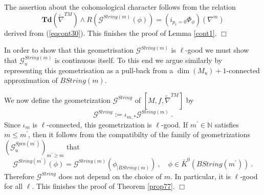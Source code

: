 \documentclass[12pt]{article}
\newcommand{\cG}{{\mathcal{G}}}
\def\hB{\hspace*{\fill}$\Box$ \newline\noindent}
\newcommand{\nat}{{\mathbb{N}}}
\newcommand{\Q}{{\mathbb{Q}}}
\newcommand{\Td}{{\mathbf{Td}}}
\begin{document}
The assertion about the cohomological character follows from  the relation
$$\Td(\tilde \nabla^{TM})\wedge R(\cG^{String(m)}(\phi))=(i_{p_{1}=0} \Phi_{ \phi })(\nabla^{m})$$
derived from (\ref{eqcont30}). This finishes the proof of Lemma \ref{cont1}. \hB

In order to show that this geometrisation $\cG^{String(m)}$   is  $\ell$-good we must show that
$ \cG_{u}^{String(m)}$ is continuous itself. To this end we argue similarly by representing this geometrisation
as a pull-back from a $\dim(M_{u})+1$-connected approximation of $BString(m)$. 

We now define   the geometrization $\cG^{String}$ of $[M,f,\tilde \nabla^{TM}]$ by
$$\cG^{String}:=\iota_{m,*} \cG^{String(m)}\ .$$  Since $\iota_{m}$ is $\ell$-connected, this geometrization is  $\ell$-good. If $m^{\prime}\in \nat $ satisfies $m\le m^{\prime}$, then it follows from the compatibilty of the family of geometrizations $(\cG_{u}^{Spin(m^{\prime})})_{m^{\prime}\ge m}$ that 
$$\cG^{String(m^{\prime})}(\phi)=\cG^{String(m)}(\phi_{|BString(m)})\ , \quad \phi\in \bar K^{0}(BString(m^{\prime}))\ .$$ 
Therefore $\cG^{String}$ does not depend on the choice of $m$.
In particular, it is $\ell$-good for all $\ell$. 
This finishes the proof of Theorem \ref{prop77}. \hB 



\color{black}


 














 
 
 
 
 
 
 
 
\end{document}
